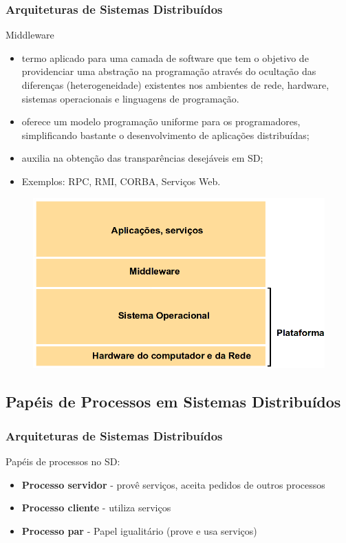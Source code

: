 \documentclass[hyperref={pdfpagelabels=false},table]{beamer}
\begin{document}
\begin{frame}[t]
	\frametitle{Arquiteturas de Sistemas Distribuídos}
	\begin{block}{Middleware}
		\begin{itemize}
			\item termo aplicado para uma camada de software que tem o objetivo de providenciar uma abstração na programação através do ocultação das diferenças ({\color{blue}heterogeneidade}) existentes nos ambientes de rede, hardware, sistemas operacionais e linguagens de programação.
			\item oferece um modelo programação uniforme para os programadores, simplificando bastante o desenvolvimento de aplicações distribuídas;
			\item auxilia na obtenção das transparências desejáveis em SD;
			\item \alert{Exemplos:} RPC, RMI, CORBA, Serviços Web. 
		\end{itemize}
	\end{block}

	\begin{figure}
		\includegraphics[scale=.2]{figs/middleware}
	\end{figure}
\end{frame}

\subsection{Papéis de Processos em Sistemas Distribuídos}
\begin{frame}[t]
	\frametitle{Arquiteturas de Sistemas Distribuídos}
	\begin{block}{Papéis de processos no SD:}
		\begin{itemize}
			\item \textbf{Processo servidor} - provê serviços, aceita pedidos de outros processos
			\item \textbf{Processo cliente} - utiliza serviços
			\item \textbf{Processo par} - Papel igualitário (prove e usa serviços)
		\end{itemize}
	\end{block}
\end{frame}
\end{document}
